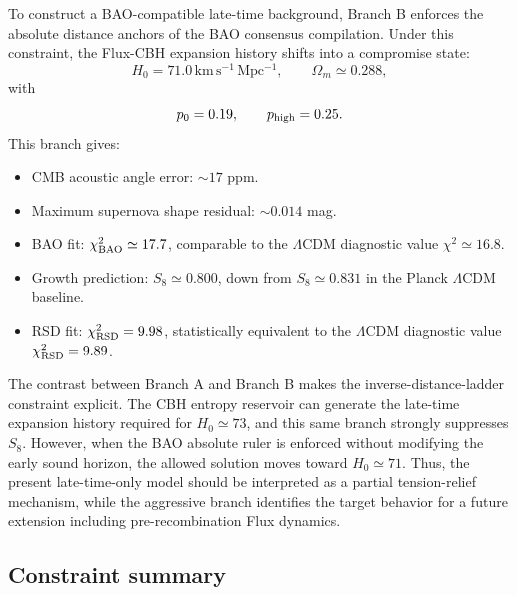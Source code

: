\documentclass[11pt,a4paper]{article}
\newcommand{\LCDM}{\ensuremath{\Lambda\mathrm{CDM}}}
\newcommand{\kmsmpc}{\ensuremath{\mathrm{km\,s^{-1}\,Mpc^{-1}}}}
\begin{document}
To construct a BAO-compatible late-time background, Branch B enforces the absolute distance anchors of the BAO consensus compilation. Under this constraint, the Flux-CBH expansion history shifts into a compromise state:
\begin{equation}
H_0=71.0\,\kmsmpc,\qquad \Omega_m\simeq0.288,
\end{equation}
with
\begin{equation}
p_0=0.19,\qquad p_{\rm high}=0.25.
\end{equation}
This branch gives:
\begin{itemize}
\item CMB acoustic angle error: $\sim17$ ppm.
\item Maximum supernova shape residual: $\sim0.014$ mag.
\item BAO fit: $\chi^2_{\rm BAO}\simeq17.7$, comparable to the \LCDM{} diagnostic value $\chi^2\simeq16.8$.
\item Growth prediction: $S_8\simeq0.800$, down from $S_8\simeq0.831$ in the Planck \LCDM{} baseline.
\item RSD fit: $\chi^2_{\rm RSD}=9.98$, statistically equivalent to the \LCDM{} diagnostic value $\chi^2_{\rm RSD}=9.89$.
\end{itemize}
The contrast between Branch A and Branch B makes the inverse-distance-ladder constraint explicit. The CBH entropy reservoir can generate the late-time expansion history required for $H_0\simeq73$, and this same branch strongly suppresses $S_8$. However, when the BAO absolute ruler is enforced without modifying the early sound horizon, the allowed solution moves toward $H_0\simeq71$. Thus, the present late-time-only model should be interpreted as a partial tension-relief mechanism, while the aggressive branch identifies the target behavior for a future extension including pre-recombination Flux dynamics.

\subsection{Constraint summary}
\end{document}
